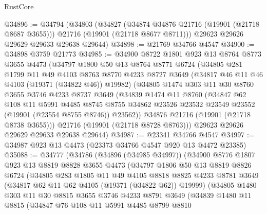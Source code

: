 \begin{lexlean}{RustCore}
\begin{coremodule}
@34896 := @34794
    (@34803
      (@34827
        (@34874 @34876 @21716 (@19901 (@21718 @8687 @3655)))
        @21716
        (@19901 (@21718 @8677 @8711)))
      @29623
      @29626
      @29629
      @29633
      @29638
      @29644)
@34898 := @21769 @34766 @4547
@34900 := @34898 @3759 @21773
@34985 := @34900
    @8722
    @1801
    @923
    @13
    @8764
    @8773
    @3655
    @4473
    (@34797
      @1800
      @50
      @13
      @8764
      @8771
      @6724
      (@34805
        @281
        @1799
        @11
        @49
        @4103
        @8763
        @8770
        @4233
        @8727
        @3649
        (@34817 @46 @11 @46 @4103 (@19371 (@34822 @46)) @19982)
        (@34805
          @1474
          @303
          @11
          @30
          @8760
          @3655
          @3746
          @4233
          @8737
          @3649
          (@34839
            @1474
            @11
            @8760
            (@34847
              @62
              @108
              @11
              @5991
              @4485
              @8745
              @8755
              @34862
              @23526
              @23532
              @23549
              @23552
              (@19901 (@23554 @8755 @8746))
              @23562))
          @34876
          @21716
          (@19901 (@21718 @8738 @3655)))
        @21716
        (@19901 (@21718 @8728 @8763)))
      @29623
      @29626
      @29629
      @29633
      @29638
      @29644)
@34987 := @23341 @34766 @4547
@34997 := @34987 @923 @13 @4473 (@23373 @34766 @4547 @920 @13 @4472 @23385)
@35088 := @34777
    (@34786
      (@34896 (@34985 @34997))
      (@34900
        @8776
        @1807
        @923
        @13
        @8819
        @8828
        @3655
        @4473
        (@34797
          @1806
          @50
          @13
          @8819
          @8826
          @6724
          (@34805
            @283
            @1805
            @11
            @49
            @4105
            @8818
            @8825
            @4233
            @8781
            @3649
            (@34817 @62 @11 @62 @4105 (@19371 (@34822 @62)) @19999)
            (@34805
              @1480
              @303
              @11
              @30
              @8815
              @3655
              @3746
              @4233
              @8791
              @3649
              (@34839
                @1480
                @11
                @8815
                (@34847
                  @76
                  @108
                  @11
                  @5991
                  @4485
                  @8799
                  @8810

\end{coremodule}
\end{lexlean}
